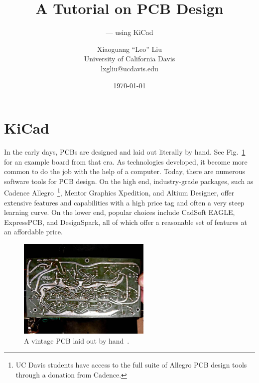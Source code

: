 \documentclass[12pt,letterpaper]{scrartcl}
\title{A Tutorial on PCB Design}
\subtitle{--- using KiCad}
\author{Xiaoguang ``Leo'' Liu \\University of California Davis \\ lxgliu@ucdavis.edu}
\date{\today}
\begin{document}
\maketitle

\tableofcontents

\newpage


\section{KiCad}
In the early days, PCBs are designed and laid out literally by hand. See Fig.~\ref{fig:hand-pcb} for an example board from that era. As technologies developed, it become more common to do the job with the help of a computer. Today, there are numerous software tools for PCB design. On the high end, industry-grade packages, such as Cadence Allegro~\footnote{UC Davis students have access to the full suite of Allegro PCB design tools through a donation from Cadence.}, Mentor Graphics Xpedition, and Altium Designer, offer extensive features and capabilities with a high price tag and often a very steep learning curve. On the lower end, popular choices include CadSoft EAGLE, ExpressPCB, and DesignSpark, all of which offer a reasonable set of features at an affordable price. 

\begin{figure}[ht]
\centering
\includegraphics[width=2.5in]{hand-pcb.jpg}
\caption{A vintage PCB laid out by hand~\cite{hand-pcb}.}
\label{fig:hand-pcb}
\end{figure}
\end{document}
